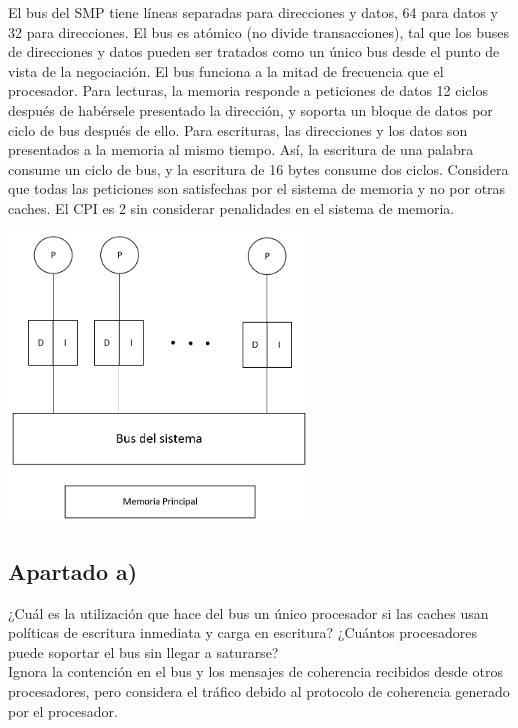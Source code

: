 \documentclass[12pt,a4paper]{article}
\begin{document}
El bus del SMP tiene líneas separadas para direcciones y datos, 64 para datos y 32 para direcciones. El bus es atómico (no divide transacciones), tal que los buses de direcciones y datos pueden ser tratados como un único bus desde el punto de vista de la negociación. El bus funciona a la mitad de frecuencia que el procesador. Para lecturas, la memoria responde a peticiones de datos 12 ciclos después de habérsele presentado la dirección, y soporta un bloque de datos por ciclo de bus después de ello. Para escrituras, las direcciones y los datos son presentados a la memoria al mismo tiempo. Así, la escritura de una palabra consume un ciclo de bus, y la escritura de 16 bytes consume dos ciclos. Considera que todas las peticiones son satisfechas por el sistema de memoria y no por otras caches. El CPI es 2 sin considerar penalidades en el sistema de memoria.\\

\begin{center}
	\includegraphics[width=0.6\textwidth]{diagrama.png}\par
\end{center}


\subsection{Apartado a)}

¿Cuál es la utilización que hace del bus un único procesador si las caches usan políticas de escritura inmediata y carga en escritura? ¿Cuántos procesadores puede soportar el bus sin llegar a saturarse?\\

Ignora la contención en el bus y los mensajes de coherencia recibidos desde otros procesadores, pero considera el tráfico debido al protocolo de coherencia generado por el procesador. 
\end{document}
